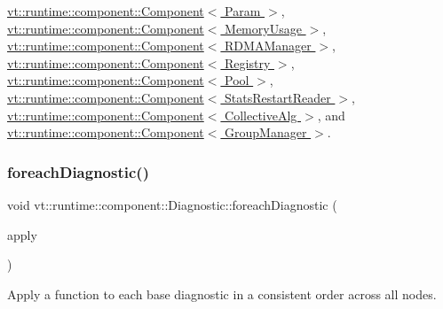 \hyperlink{structvt_1_1runtime_1_1component_1_1_component_adaf8bd995d4c91702e2ff7806ad9e695}{vt\+::runtime\+::component\+::\+Component$<$ Param $>$}, \hyperlink{structvt_1_1runtime_1_1component_1_1_component_adaf8bd995d4c91702e2ff7806ad9e695}{vt\+::runtime\+::component\+::\+Component$<$ Memory\+Usage $>$}, \hyperlink{structvt_1_1runtime_1_1component_1_1_component_adaf8bd995d4c91702e2ff7806ad9e695}{vt\+::runtime\+::component\+::\+Component$<$ R\+D\+M\+A\+Manager $>$}, \hyperlink{structvt_1_1runtime_1_1component_1_1_component_adaf8bd995d4c91702e2ff7806ad9e695}{vt\+::runtime\+::component\+::\+Component$<$ Registry $>$}, \hyperlink{structvt_1_1runtime_1_1component_1_1_component_adaf8bd995d4c91702e2ff7806ad9e695}{vt\+::runtime\+::component\+::\+Component$<$ Pool $>$}, \hyperlink{structvt_1_1runtime_1_1component_1_1_component_adaf8bd995d4c91702e2ff7806ad9e695}{vt\+::runtime\+::component\+::\+Component$<$ Stats\+Restart\+Reader $>$}, \hyperlink{structvt_1_1runtime_1_1component_1_1_component_adaf8bd995d4c91702e2ff7806ad9e695}{vt\+::runtime\+::component\+::\+Component$<$ Collective\+Alg $>$}, and \hyperlink{structvt_1_1runtime_1_1component_1_1_component_adaf8bd995d4c91702e2ff7806ad9e695}{vt\+::runtime\+::component\+::\+Component$<$ Group\+Manager $>$}.

\mbox{\label{structvt_1_1runtime_1_1component_1_1_diagnostic_a1d6951af40ad0b4020860c0b21b1a85c}} 
\subsubsection{\texorpdfstring{foreach\+Diagnostic()}{foreachDiagnostic()}}
{\footnotesize\ttfamily void vt\+::runtime\+::component\+::\+Diagnostic\+::foreach\+Diagnostic (\begin{DoxyParamCaption}\item[{std\+::function$<$ void(\hyperlink{structvt_1_1runtime_1_1component_1_1detail_1_1_diagnostic_base}{detail\+::\+Diagnostic\+Base} $\ast$)$>$}]{apply }\end{DoxyParamCaption})}



Apply a function to each base diagnostic in a consistent order across all nodes. 


